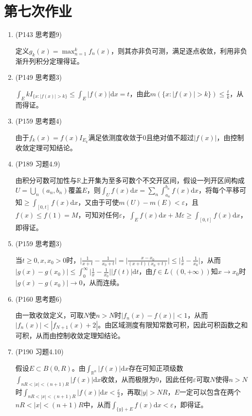 \documentclass[a4paper,UTF8,fontset=windows]{ctexart}
\begin{document}
\section{第七次作业}
\begin{enumerate}
    \item (P143 思考题9)
    
    定义$g_k(x)=\max_{n=1}^kf_n(x)$，则其亦非负可测，满足逐点收敛，利用非负渐升列积分定理得证。
    
    \item (P149 思考题3)
    
    $\int_EkI_{\{x:|f(x)|>k\}}\le\int_E|f(x)|\mathrm{d}x=t$，由此$m(\{x:|f(x)|>k\})\le\frac{t}{k}$，从而得证。
    
    \item (P159 思考题4)
    
    由于$f_k(x)=f(x)I_{E_k}$满足依测度收敛于0且绝对值不超过$|f(x)|$，由控制收敛定理可知结论。
    
    \item (P189 习题4.9)
    
    由积分可数可加性与$\mathbb{R}$上开集为至多可数个不交开区间，假设一列开区间构成$U=\bigcup_n(a_n,b_n)$覆盖$E$，则$\int_Uf(x)\mathrm{d}x=\sum_n\int_{a_n}^{b_n}f(x)\mathrm{d}x$，将每个平移可知$\ge\int_{[0,t]}f(x)\mathrm{d}x$，又由于可使$m(U)-m(E)<\varepsilon$，且$f(x)\le f(1)=M$，可知对任何$\varepsilon$，$\int_Ef(x)\mathrm{d}x+M\varepsilon\ge\int_{[0,t]}f(x)\mathrm{d}x$，即得证。
    
    \item (P159 思考题3)
    
    当$t\ge0,x,x_0>0$时，$\big|\frac{1}{x+t}-\frac{1}{x_0+t}\big|=\big|\frac{x-x_0}{(x+t)(x_0+t)}\big|\le\big|\frac{1}{x}-\frac{1}{x_0}\big|$，从而$|g(x)-g(x_0)|\le\int_0^\infty\big|\frac{1}{x}-\frac{1}{x_0}\big||f(t)|\mathrm{d}t$，由$f\in L((0,+\infty))$知$x\to x_0$时$|g(x)-g(x_0)|\to0$，从而连续。
    
    \item (P160 思考题6)
    
    由一致收敛定义，可取$N$使$n>N$时$|f_n(x)-f(x)|<1$，从而$|f_n(x)|<|f_{N+1}(x)+2|$。由区域测度有限知常数可积，因此可积函数之和可积，从而由控制收敛定理知结论。
    
    \item (P190 习题4.10)
    
    假设$E\subset B(0,R)$。由$\int_{\mathbb{R}^n}|f(x)|\mathrm{d}x$存在可知正项级数$\int_{nR<|x|<(n+1)R}|f(x)|\mathrm{d}x$收敛，从而极限为0，因此任何$\varepsilon$可取$N$使得$n>N$时$\int_{nR<|x|<(n+1)R}|f(x)|\mathrm{d}x<\frac{\varepsilon}{2}$，再取$|y|>NR$，$E$一定可以包含在两个$nR<|x|<(n+1)R$中，从而$\int_{\{y\}+E}f(x)\mathrm{d}x<\varepsilon$，即得证。
    

\end{enumerate}
\end{document}

